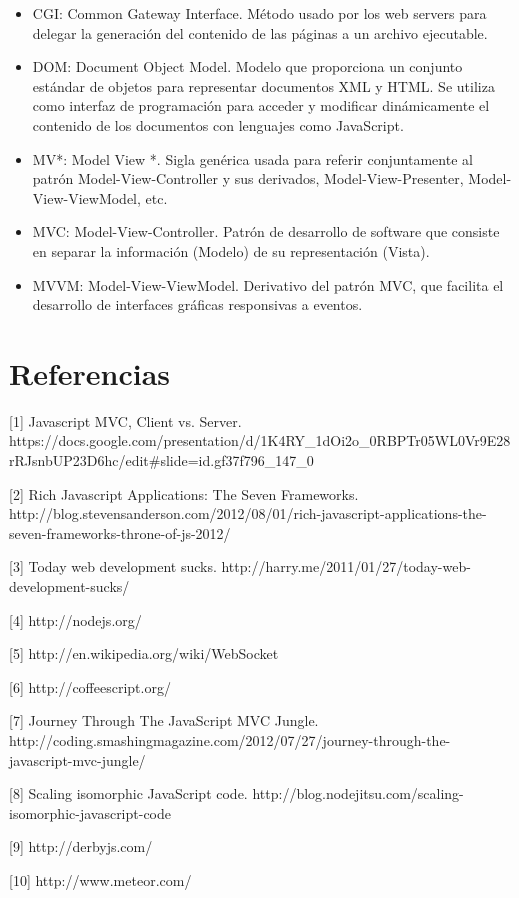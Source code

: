 \documentclass[doc,helv,longtable]{article}
\begin{document}
\begin{itemize}
\item  CGI: Common Gateway Interface. Método usado por los web servers para delegar la generación del contenido de las páginas a un archivo ejecutable.
\item  DOM: Document Object Model. Modelo que proporciona un conjunto estándar de objetos para representar documentos XML y HTML. Se utiliza como interfaz de programación para acceder y modificar dinámicamente el contenido de los documentos con lenguajes como JavaScript.
\item  MV*: Model View *. Sigla genérica usada para referir conjuntamente al patrón Model-View-Controller y sus derivados, Model-View-Presenter, Model-View-ViewModel, etc.
\item  MVC: Model-View-Controller. Patrón de desarrollo de software que consiste en separar la información (Modelo) de su representación (Vista).
\item  MVVM: Model-View-ViewModel. Derivativo del patrón MVC, que facilita el desarrollo de interfaces gráficas responsivas a eventos.

\end{itemize}
\section{Referencias}


[1] Javascript MVC, Client vs. Server. https://docs.google.com/presentation/d/1K4RY_1dOi2o_0RBPTr05WL0Vr9E28rRJsnbUP23D6hc/edit#slide=id.gf37f796_147_0

[2] Rich Javascript Applications: The Seven Frameworks. http://blog.stevensanderson.com/2012/08/01/rich-javascript-applications-the-seven-frameworks-throne-of-js-2012/

[3] Today web development sucks. http://harry.me/2011/01/27/today-web-development-sucks/

[4] http://nodejs.org/

[5] http://en.wikipedia.org/wiki/WebSocket

[6] http://coffeescript.org/

[7] Journey Through The JavaScript MVC Jungle. http://coding.smashingmagazine.com/2012/07/27/journey-through-the-javascript-mvc-jungle/

[8] Scaling isomorphic JavaScript code. http://blog.nodejitsu.com/scaling-isomorphic-javascript-code

[9] http://derbyjs.com/

[10] http://www.meteor.com/
\end{document}

